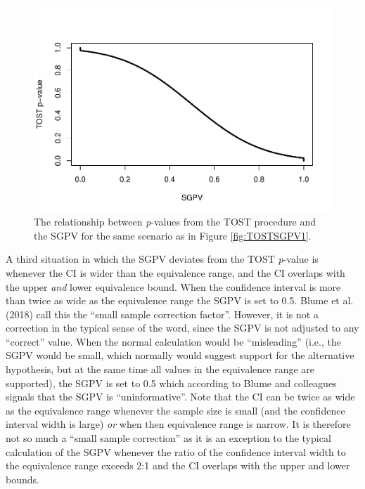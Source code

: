 \documentclass[floatsintext,man]{apa6}
\theoremstyle{definition}
\theoremstyle{definition}
\theoremstyle{definition}
\theoremstyle{remark}
\begin{document}
\begin{figure}
\centering
\includegraphics{manuscript_files/figure-latex/TOSTSGPV5-1.pdf}
\caption{\label{fig:TOSTSGPV5}The relationship between \emph{p}-values from
the TOST procedure and the SGPV for the same scenario as in Figure
\ref{fig:TOSTSGPV1}.}
\end{figure}

A third situation in which the SGPV deviates from the TOST
\emph{p}-value is whenever the CI is wider than the equivalence range,
and the CI overlaps with the upper \emph{and} lower equivalence bound.
When the confidence interval is more than twice as wide as the
equivalence range the SGPV is set to 0.5. Blume et al. (2018) call this
the \enquote{small sample correction factor}. However, it is not a
correction in the typical sense of the word, since the SGPV is not
adjusted to any \enquote{correct} value. When the normal calculation
would be \enquote{misleading} (i.e., the SGPV would be small, which
normally would suggest support for the alternative hypothesis, but at
the same time all values in the equivalence range are supported), the
SGPV is set to 0.5 which according to Blume and colleagues signals that
the SGPV is \enquote{uninformative}. Note that the CI can be twice as
wide as the equivalence range whenever the sample size is small (and the
confidence interval width is large) \emph{or} when then equivalence
range is narrow. It is therefore not so much a \enquote{small sample
correction} as it is an exception to the typical calculation of the SGPV
whenever the ratio of the confidence interval width to the equivalence
range exceeds 2:1 and the CI overlaps with the upper and lower bounds.
\end{document}
